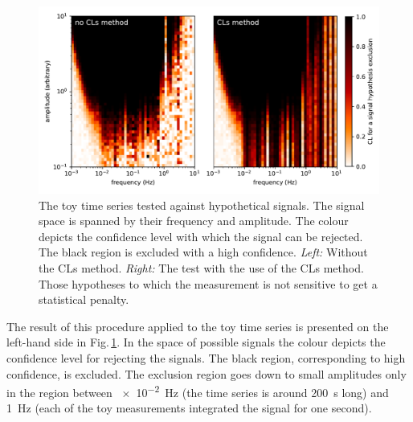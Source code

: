 \begin{figure}
  \centering
  \includegraphics[width=\linewidth]{gfx/axions/basic_exclusion.pdf}
  \caption{The toy time series tested against hypothetical signals.
  The signal space is spanned by their frequency and amplitude.
  The colour depicts the confidence level with which the signal can be rejected.
  The black region is excluded with a high confidence.
  \emph{Left:} Without the CLs method.
  \emph{Right:} The test with the use of the CLs method.
  Those hypotheses to which the measurement is not sensitive to get a statistical penalty.}\label{fig:axions_exclusions}
\end{figure}

The result of this procedure applied to the toy time series is presented on the left-hand side in Fig.\,\ref{fig:axions_exclusions}.
In the space of possible signals the colour depicts the confidence level for rejecting the signals.
The black region, corresponding to high confidence, is excluded.
The exclusion region goes down to small amplitudes only in the region between \SI{e-2}{\hertz} (the time series is around \SI{200}{\second} long) and \SI{1}{\hertz} (each of the toy measurements integrated the signal for one second).

